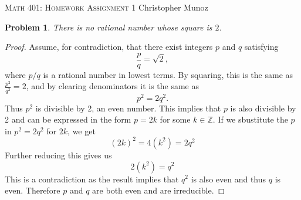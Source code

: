 \documentclass[12pt]{article}
\newtheorem{problem}{Problem}
\newcommand{\ZZ}{\ensuremath{\mathbb Z}}
\begin{document}
\small
\noindent \textsc{Math 401: Homework Assignment 1} \hfill Christopher Munoz

\noindent \hfill \normalsize
\bigskip

\setcounter{problem}{0} %


\begin{problem} %
There is no rational number whose square is $2$. \end{problem}


\begin{proof}
Assume, for contradiction, that there exist integers $p$ and $q$ satisfying
	$$\frac{p}{q} = \sqrt{2},$$
where $p/q$ is a rational number in lowest terms.  By squaring, this is the same as $\frac{p^2}{q^2} = 2$, and by clearing denominators it is the same as
	$$p^2 = 2 q^2.$$
	Thus $p^2$ is divisible by 2, an even number. This implies that $p$ is also divisible by 2 and can be expressed in the form $p = 2k$ for some $k \in \ZZ$. If we sbustitute the $p$ in $p^2 = 2q^2$ for $2k$, we get
	$$(2k)^2 = 4(k^2) = 2q^2$$
	Further reducing this gives us
	$$2(k^2) = q^2$$
	This is a contradiction as the result implies that $q^2$ is also even and thus $q$ is even. Therefore $p$ and $q$ are both even and are irreducible.

\end{proof}
\end{document}
